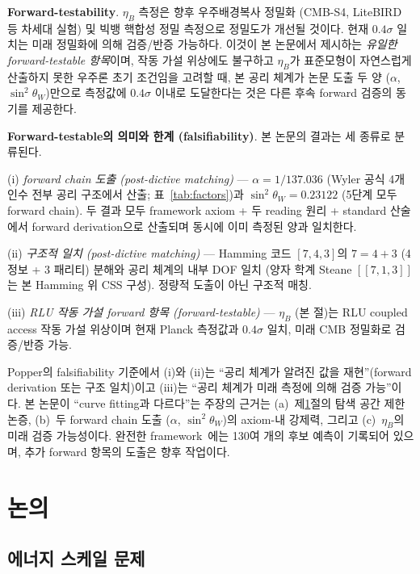 \documentclass[entropy,article,submit,pdftex,oneauthor]{Definitions/mdpi}
\begin{document}
\textbf{Forward-testability}. $\eta_B$ 측정은 향후 우주배경복사 정밀화 (CMB-S4, LiteBIRD 등 차세대 실험) 및 빅뱅 핵합성 정밀 측정으로 정밀도가 개선될 것이다. 현재 $0.4\sigma$ 일치는 미래 정밀화에 의해 검증/반증 가능하다. 이것이 본 논문에서 제시하는 \emph{유일한 forward-testable 항목}이며, 작동 가설 위상에도 불구하고 $\eta_B$가 표준모형이 자연스럽게 산출하지 못한 우주론 초기 조건임을 고려할 때, 본 공리 체계가 논문 도출 두 양 ($\alpha$, $\sin^2\theta_W$)만으로 측정값에 $0.4\sigma$ 이내로 도달한다는 것은 다른 후속 forward 검증의 동기를 제공한다.

\textbf{Forward-testable의 의미와 한계 (falsifiability)}.
본 논문의 결과는 세 종류로 분류된다.

(i) \emph{forward chain 도출 (post-dictive matching)} --- $\alpha = 1/137.036$ (Wyler 공식 4개 인수 전부 공리 구조에서 산출; 표~\ref{tab:factors})과 $\sin^2\theta_W = 0.23122$ (5단계 모두 forward chain). 두 결과 모두 framework axiom + 두 reading 원리 + standard 산술에서 forward derivation으로 산출되며 동시에 이미 측정된 양과 일치한다.

(ii) \emph{구조적 일치 (post-dictive matching)} --- Hamming 코드 $[7,4,3]$의 $7 = 4 + 3$ (4 정보 + 3 패리티) 분해와 공리 체계의 내부 DOF 일치 (양자 학계 Steane $[[7,1,3]]$는 본 Hamming 위 CSS 구성). 정량적 도출이 아닌 구조적 매칭.

(iii) \emph{RLU 작동 가설 forward 항목 (forward-testable)} --- $\eta_B$ (본 절)는 RLU coupled access 작동 가설 위상이며 현재 Planck 측정값과 $0.4\sigma$ 일치, 미래 CMB 정밀화로 검증/반증 가능.

Popper의 falsifiability 기준에서 (i)와 (ii)는 ``공리 체계가 알려진 값을 재현''(forward derivation 또는 구조 일치)이고 (iii)는 ``공리 체계가 미래 측정에 의해 검증 가능''이다. 본 논문이 ``curve fitting과 다르다''는 주장의 근거는 (a)~제\ref{sec:discussion}절의 탐색 공간 제한 논증, (b)~두 forward chain 도출 ($\alpha$, $\sin^2\theta_W$)의 axiom-내 강제력, 그리고 (c)~$\eta_B$의 미래 검증 가능성이다. 완전한 framework~\cite{han2026}에는 130여 개의 후보 예측이 기록되어 있으며, 추가 forward 항목의 도출은 향후 작업이다.

\section{논의}
\label{sec:discussion}

\subsection{에너지 스케일 문제}
\end{document}
